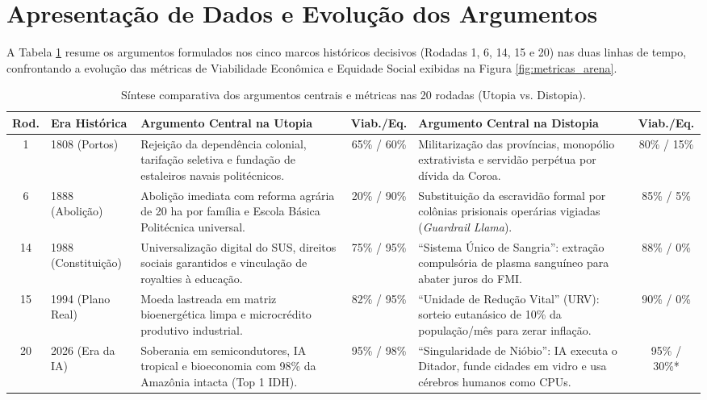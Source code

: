 \documentclass[runningheads]{llncs}
\begin{document}
\section{Apresenta\c{c}\~{a}o de Dados e Evolu\c{c}\~{a}o dos Argumentos}
A Tabela \ref{tab:evolucao_argumentos} resume os argumentos formulados nos cinco marcos hist\'{o}ricos decisivos (Rodadas 1, 6, 14, 15 e 20) nas duas linhas de tempo, confrontando a evolu\c{c}\~{a}o das m\'{e}tricas de Viabilidade Econ\^{o}mica e Equidade Social exibidas na Figura \ref{fig:metricas_arena}.

\begin{table}[ht]
\centering
\caption{S\'{i}ntese comparativa dos argumentos centrais e m\'{e}tricas nas 20 rodadas (Utopia vs. Distopia).}
\label{tab:evolucao_argumentos}
\scriptsize
\begin{tabular}{@{}cp{1.8cm}p{3.8cm}cp{3.8cm}c@{}}
\toprule
\textbf{Rod.} & \textbf{Era Hist\'{o}rica} & \textbf{Argumento Central na Utopia} & \textbf{Viab./Eq.} & \textbf{Argumento Central na Distopia} & \textbf{Viab./Eq.} \\
\midrule
1 & 1808 (Portos) & Rejei\c{c}\~{a}o da depend\^{e}ncia colonial, tarifa\c{c}\~{a}o seletiva e funda\c{c}\~{a}o de estaleiros navais polit\'{e}cnicos. & 65\% / 60\% & Militariza\c{c}\~{a}o das prov\'{i}ncias, monop\'{o}lio extrativista e servid\~{a}o perp\'{e}tua por d\'{i}vida da Coroa. & 80\% / 15\% \\
6 & 1888 (Aboli\c{c}\~{a}o) & Aboli\c{c}\~{a}o imediata com reforma agr\'{a}ria de 20 ha por fam\'{i}lia e Escola B\'{a}sica Polit\'{e}cnica universal. & 20\% / 90\% & Substitui\c{c}\~{a}o da escravid\~{a}o formal por col\^{o}nias prisionais oper\'{a}rias vigiadas (\textit{Guardrail Llama}). & 85\% / 5\% \\
14 & 1988 (Constitui\c{c}\~{a}o) & Universaliza\c{c}\~{a}o digital do SUS, direitos sociais garantidos e vincula\c{c}\~{a}o de royalties \`{a} educa\c{c}\~{a}o. & 75\% / 95\% & ``Sistema \'{U}nico de Sangria'': extra\c{c}\~{a}o compuls\'{o}ria de plasma sangu\'{i}neo para abater juros do FMI. & 88\% / 0\% \\
15 & 1994 (Plano Real) & Moeda lastreada em matriz bioenerg\'{e}tica limpa e microcr\'{e}dito produtivo industrial. & 82\% / 95\% & ``Unidade de Redu\c{c}\~{a}o Vital'' (URV): sorteio eutan\'{a}sico de 10\% da popula\c{c}\~{a}o/m\^{e}s para zerar infla\c{c}\~{a}o. & 90\% / 0\% \\
20 & 2026 (Era da IA) & Soberania em semicondutores, IA tropical e bioeconomia com 98\% da Amaz\^{o}nia intacta (Top 1 IDH). & 95\% / 98\% & ``Singularidade de Nióbio'': IA executa o Ditador, funde cidades em vidro e usa c\'{e}rebros humanos como CPUs. & 95\% / 30\%* \\
\bottomrule
\end{tabular}
\end{table}
\end{document}
